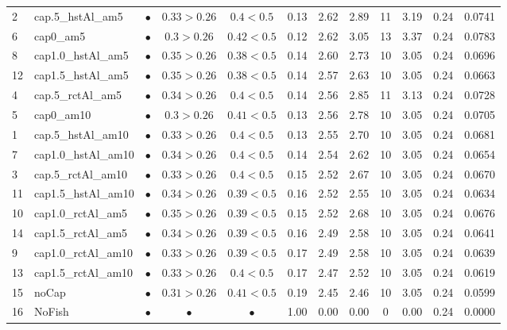 \documentclass[11pt]{book}
\begin{document}
\begin{turn}
\begin{longtable}[t]{llcccccccccc}
2 & cap.5\_hstAl\_am5 & $\bullet$ & $0.33>0.26$ & $0.4<0.5$ & 0.13 & 2.62 & 2.89 & 11 & 3.19 & 0.24 & 0.0741\\
6 & cap0\_am5 & $\bullet$ & $0.3>0.26$ & $0.42<0.5$ & 0.12 & 2.62 & 3.05 & 13 & 3.37 & 0.24 & 0.0783\\
8 & cap1.0\_hstAl\_am5 & $\bullet$ & $0.35>0.26$ & $0.38<0.5$ & 0.14 & 2.60 & 2.73 & 10 & 3.05 & 0.24 & 0.0696\\
12 & cap1.5\_hstAl\_am5 & $\bullet$ & $0.35>0.26$ & $0.38<0.5$ & 0.14 & 2.57 & 2.63 & 10 & 3.05 & 0.24 & 0.0663\\
4 & cap.5\_rctAl\_am5 & $\bullet$ & $0.34>0.26$ & $0.4<0.5$ & 0.14 & 2.56 & 2.85 & 11 & 3.13 & 0.24 & 0.0728\\
5 & cap0\_am10 & $\bullet$ & $0.3>0.26$ & $0.41<0.5$ & 0.13 & 2.56 & 2.78 & 10 & 3.05 & 0.24 & 0.0705\\
1 & cap.5\_hstAl\_am10 & $\bullet$ & $0.33>0.26$ & $0.4<0.5$ & 0.13 & 2.55 & 2.70 & 10 & 3.05 & 0.24 & 0.0681\\
7 & cap1.0\_hstAl\_am10 & $\bullet$ & $0.34>0.26$ & $0.4<0.5$ & 0.14 & 2.54 & 2.62 & 10 & 3.05 & 0.24 & 0.0654\\
3 & cap.5\_rctAl\_am10 & $\bullet$ & $0.33>0.26$ & $0.4<0.5$ & 0.15 & 2.52 & 2.67 & 10 & 3.05 & 0.24 & 0.0670\\
11 & cap1.5\_hstAl\_am10 & $\bullet$ & $0.34>0.26$ & $0.39<0.5$ & 0.16 & 2.52 & 2.55 & 10 & 3.05 & 0.24 & 0.0634\\
10 & cap1.0\_rctAl\_am5 & $\bullet$ & $0.35>0.26$ & $0.39<0.5$ & 0.15 & 2.52 & 2.68 & 10 & 3.05 & 0.24 & 0.0676\\
14 & cap1.5\_rctAl\_am5 & $\bullet$ & $0.34>0.26$ & $0.39<0.5$ & 0.16 & 2.49 & 2.58 & 10 & 3.05 & 0.24 & 0.0641\\
9 & cap1.0\_rctAl\_am10 & $\bullet$ & $0.33>0.26$ & $0.39<0.5$ & 0.17 & 2.49 & 2.58 & 10 & 3.05 & 0.24 & 0.0639\\
13 & cap1.5\_rctAl\_am10 & $\bullet$ & $0.33>0.26$ & $0.4<0.5$ & 0.17 & 2.47 & 2.52 & 10 & 3.05 & 0.24 & 0.0619\\
15 & noCap & $\bullet$ & $0.31>0.26$ & $0.41<0.5$ & 0.19 & 2.45 & 2.46 & 10 & 3.05 & 0.24 & 0.0599\\
16 & NoFish & $\bullet$ & $\bullet$ & $\bullet$ & 1.00 & 0.00 & 0.00 & 0 & 0.00 & 0.24 & 0.0000\\
\bottomrule
\end{longtable}
\endgroup{}
\endgroup{}

\newpage


\end{turn}
\end{document}
